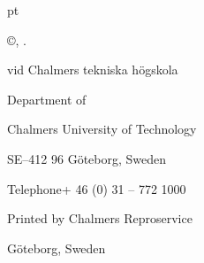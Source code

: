 \vspace*{50 pt}
{
  \thispagestyle{empty}         %

   pt

  \thesistitle

  \thesissubtitle

  \textsc{\thesisauthor}

  \thesisisbn

  \vskip 1pc

  \copyright\enskip \textsc{\thesisauthor, \thesisyear.}

  \vskip 1pc

   vid Chalmers tekniska högskola


  \thesisissn

  \vskip 1pc

  Department of \thesisdepartment

  Chalmers University of Technology

  SE--412 96 Göteborg, Sweden

  Telephone\enskip+ 46 (0) 31 -- 772 1000

  \vfill

  \thesiscoverdescription

  \vskip 2pc


  \vskip 1pc

  Printed by Chalmers Reproservice

  Göteborg, Sweden \thesisyear
}

\clearpage

